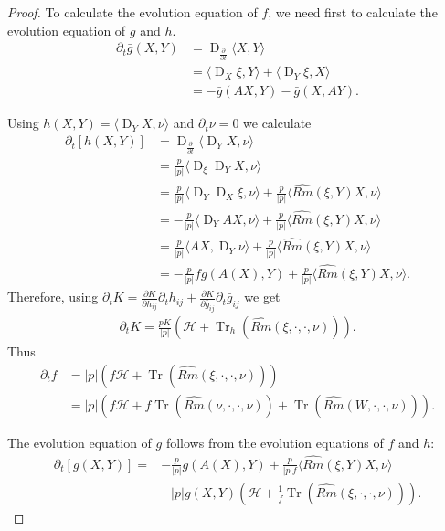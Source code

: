 \documentclass{amsart}
\theoremstyle{definition}
\theoremstyle{remark}
\DeclareMathOperator{\Tr}{Tr}
\DeclareMathOperator{\D}{D}
\numberwithin{equation}{section}
\begin{document}
\begin{proof}
To calculate the evolution equation of $ f $, we need first to calculate the evolution equation of $\bar{g}$ and $h.$
\begin{align*}
\partial_t \bar{g}(X,Y)&=\D_{\frac{\partial}{\partial t}}\langle X,Y\rangle\\
&=\langle \D_X\xi,Y\rangle+\langle \D_Y\xi,X\rangle\\
&=-\bar{g}( AX,Y)-\bar{g}(X,AY).
\end{align*}

Using $h(X,Y)=\langle \D_{Y}X, \nu\rangle$ and $\partial_t\nu=0$ we calculate
\begin{align*}
\partial_t [h(X,Y)] &= \D_{\frac{\partial}{\partial t}}\langle \D_{Y}X,\nu\rangle\\
&=\frac{p}{|p|}\langle \D_{\xi}\D_{Y}X,\nu\rangle\\
&=\frac{p}{|p|}\langle \D_{Y}\D_{X}\xi,\nu\rangle+ \frac{p}{|p|}\langle \widehat{Rm}(\xi,Y)X,\nu\rangle\\
&=-\frac{p}{|p|}\langle \D_{Y}AX,\nu\rangle+ \frac{p}{|p|}\langle \widehat{Rm}(\xi,Y)X,\nu\rangle\\
&=\frac{p}{|p|}\langle AX,\D_{Y}\nu\rangle+ \frac{p}{|p|}\langle \widehat{Rm}(\xi,Y)X,\nu\rangle\\
&=-\frac{p}{|p|} f  g(A(X),Y)+\frac{p}{|p|}\langle \widehat{Rm}(\xi,Y)X,\nu\rangle.
\end{align*}
Therefore, using $\partial_t K=\frac{\partial K}{\partial h_{ij}}\partial_th_{ij}+\frac{\partial K}{\partial \bar{g}_{ij}}\partial_t\bar{g}_{ij}$ we get
\begin{align*}
\partial_tK=\frac{pK}{|p|}(\mathcal{H}+\Tr_h (\widehat{Rm}(\xi,\cdot,\cdot,\nu))).
\end{align*}
Thus
\begin{align}
 \partial_tf&=|p|(f\mathcal{H}+\Tr (\widehat{Rm}(\xi,\cdot,\cdot,\nu)))\nonumber\\
&= |p|(f\mathcal{H}+f\Tr (\widehat{Rm}(\nu,\cdot,\cdot,\nu))+\Tr (\widehat{Rm}(W,\cdot,\cdot,\nu))).
\end{align}

The evolution equation of $g$ follows from the evolution equations of $ f $ and $h:$
\begin{align*}
\partial_t [g(X,Y)] = &-\frac{p}{|p|}g(A(X),Y)+\frac{p}{|p|f}\langle \widehat{Rm}(\xi,Y)X,\nu\rangle\\
&-
|p|g(X,Y)(\mathcal{H}+\frac{1}{f}\Tr (\widehat{Rm}(\xi,\cdot,\cdot,\nu))).
\end{align*}


\end{proof}
\end{document}
